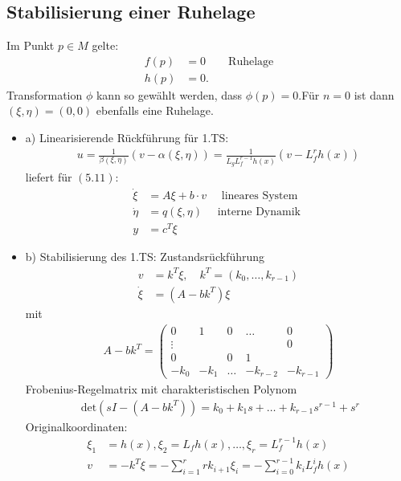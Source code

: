 \documentclass[ngerman]{tudscrreprt}
\begin{document}
\subsection{Stabilisierung einer Ruhelage}
Im Punkt $p \in M $ gelte: \begin{align*} f(p) &= 0 \qquad \text{Ruhelage}\\ h(p)&= 0. \end{align*} 
Transformation $\phi$ kann so gewählt werden, dass $\phi(p) = 0.$Für $n=0$ ist dann $(\xi, \eta) = (0, 0)$ ebenfalls eine Ruhelage.
\begin{itemize}
\item a) Linearisierende Rückführung für 1.TS: \begin{align*}
u = \frac{1}{\beta(\xi, \eta)} (v - \alpha(\xi, \eta)) = \frac{1}{L_g L_f^{r-1} h(x)}(v - L_f^r h(x))
\end{align*} liefert für $(5.11):$
\begin{align*}
\dot \xi &= A\xi + b\cdot v\quad \text{ lineares System}\\ 
\dot \eta &= q(\xi, \eta) \quad \text{ interne Dynamik }\\ 
y &= c^T \xi \tag{5.12}
\end{align*}
\item b) Stabilisierung des 1.TS: Zustandsrückführung \begin{align*}
v&= k^T\xi , \quad k^T = (k_0,\dots, k_{r-1}) \\ 
\dot \xi &= (A - bk^T)\xi 
\end{align*}mit 
\begin{align*}
A - bk^T = \begin{pmatrix} 0 & 1 & 0 &\dots & 0\\ \vdots &&&&0\\ 0 &&0 & 1\\ -k_0 & -k_1 &\dots& -k_{r-2}&-k_{r-1}  \end{pmatrix}
\end{align*}
Frobenius-Regelmatrix mit 
charakteristischen Polynom 
\begin{align*}
\text{ det}(sI - (A - bk^T)) =  k_0 + k_1 s + \dots + k_{r-1}s^{r-1} + s^r \tag{5.13}
\end{align*}
Originalkoordinaten: \begin{align*} 
\xi_1 &= h(x), \xi_2 = L_fh(x),\dots, \xi_r = L_f^{r-1}h(x)\\ 
v&= -k^T \xi = - \sum\limits_{i=1}^{r} rk_{i+1} \xi_i = - \sum\limits_{i=0}^{r-1}k_i L_f^i h(x)
\end{align*}

\end{itemize}
\end{document}
